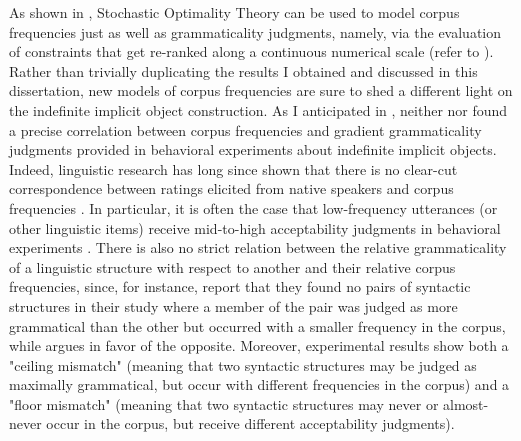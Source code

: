 As shown in \textcite{Boersma2004, BoersmaHayes2001empirical}, Stochastic Optimality Theory can be used to model corpus frequencies just as well as grammaticality judgments, namely, via the evaluation of constraints that get re-ranked along a continuous numerical scale (refer to ). Rather than trivially duplicating the results I obtained and discussed in this dissertation, new models of corpus frequencies are sure to shed a different light on the indefinite implicit object construction. As I anticipated in , neither \textcite{Resnik1993, Resnik1996} nor \textcite{Medina2007} found a precise correlation between corpus frequencies and gradient grammaticality judgments provided in behavioral experiments about indefinite implicit objects.\\
Indeed, linguistic research has long since shown that there is no clear-cut correspondence between ratings elicited from native speakers and corpus frequencies \parencite{manning2003probabilistic}. In particular, it is often the case that low-frequency utterances (or other linguistic items) receive mid-to-high acceptability judgments in behavioral experiments \parencite{KempenHarbusch2005, BermelKnittl2012, BaderHaussler2010, Boersma2004, KellerAsudeh2002}. There is also no strict relation between the relative grammaticality of a linguistic structure with respect to another and their relative corpus frequencies, since, for instance, \textcite[315-316]{BaderHaussler2010} report that they found no pairs of syntactic structures in their study where a member of the pair was judged as more grammatical than the other but occurred with a smaller frequency in the corpus, while \textcite{Boersma2004} argues in favor of the opposite. Moreover, \textcite{BaderHaussler2010} experimental results show both a "ceiling mismatch" (meaning that two syntactic structures may be judged as maximally grammatical, but occur with different frequencies in the corpus) and a "floor mismatch" (meaning that two syntactic structures may never or almost-never occur in the corpus, but receive different acceptability judgments).\\
